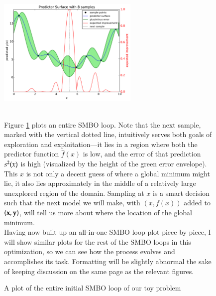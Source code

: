 \begin{figure}[h!]
\centering
\includegraphics[width=0.6\textwidth]{images/ego_ex/0}
\caption{A plot of the entire initial SMBO loop of our toy problem\\}
\label{fig:first_imp}
\begin{minipage}{\textwidth}

\ \\ Figure \ref{fig:first_imp} plots an entire SMBO loop. Note that the next sample, marked with the vertical dotted line, intuitively serves both goals of exploration and exploitation---it lies in a region where both the predictor function $\hat{f}(x)$ is low, and the error of that prediction $s^2(x)$ is high (visualized by the height of the green error envelope). This $x$ is not only a decent guess of where a global minimum might lie, it also lies approximately in the middle of a relatively large unexplored region of the domain. Sampling at $x$ is a smart decision such that the next model we will make, with $(x,f(x))$ added to $(\mathbf{x},\mathbf{y})$, will tell us more about where the location of the global minimum.\\

Having now built up an all-in-one SMBO loop plot piece by piece, I will show similar plots for the rest of the SMBO loops in this optimization, so we can see how the process evolves and accomplishes its task. Formatting will be slightly abnormal the sake of keeping discussion on the same page as the relevant figures.


\end{minipage}

\end{figure}




